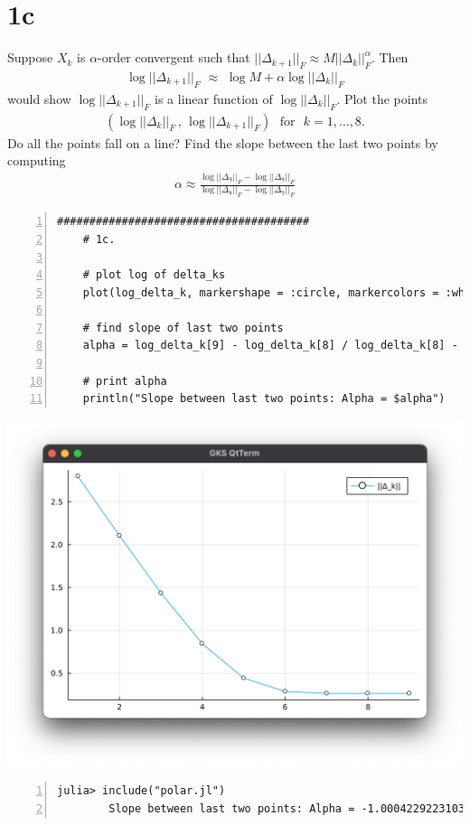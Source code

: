 \documentclass{article}
\begin{document}
    \section*{1c}
    Suppose $X_k$ is $\alpha$-order convergent such that $||\Delta_{k+1}||_F \approx M||\Delta_k||_F^\alpha$. Then
    \begin{align*}
        \log ||\Delta_{k+1}||_F \,\, \approx \,\, \log M + \alpha \log ||\Delta_k||_F
    \end{align*}
    would show $\log ||\Delta_{k+1}||_F$ is a linear function of $\log||\Delta_k||_F$. Plot the points
    \begin{align*}
        \left(\log ||\Delta_k||_F \,,\, \log ||\Delta_{k+1}||_F\right) \,\,\text{  for  }\,\, k = 1, \ldots, 8.
    \end{align*}
    Do all the points fall on a line? Find the slope between the last two points by computing
    \begin{align*}
        \alpha \approx \frac{\log||\Delta_9||_F - \log ||\Delta_8||_F}{\log||\Delta_8||_F - \log ||\Delta_7||_F}
    \end{align*}
    \vspace{1em}
    \begin{Verbatim}[frame=single, label=Plot Delta k Points, numbers=left, fontsize=\small, xleftmargin=-.75cm, xrightmargin=-.75cm, framesep=3mm]
    #######################################
    # 1c.
  
    # plot log of delta_ks
    plot(log_delta_k, markershape = :circle, markercolors = :white, label="||Delta_k||")
  
    # find slope of last two points
    alpha = log_delta_k[9] - log_delta_k[8] / log_delta_k[8] - log_delta_k[7]

    # print alpha
    println("Slope between last two points: Alpha = $alpha")
    \end{Verbatim}
    \includegraphics[scale=.5]{plot1}
    \vspace{1em}
    \begin{Verbatim}[frame=single, label=Julia REPL for finding Alpha, numbers=left, fontsize=\small, xleftmargin=0cm, framesep=3mm]
        julia> include("polar.jl")
        Slope between last two points: Alpha = -1.0004229223103496
    \end{Verbatim}
    \vspace{1em}
    \bigbreak\dotfill\bigbreak
\end{document}
